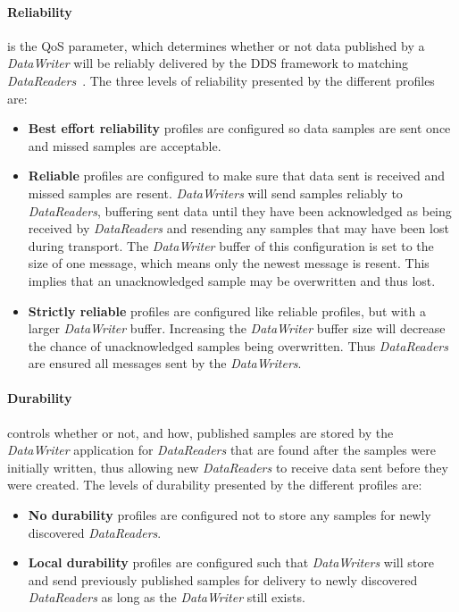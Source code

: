 \paragraph{Reliability} is the QoS parameter, which determines whether or not data published by a \textit{DataWriter} will be reliably delivered by the DDS framework to matching \textit{DataReaders}~\cite{rtiConnextUsersManual}. The three levels of reliability presented by the different profiles are:

\begin{itemize}
	\item \textbf{Best effort reliability} profiles are configured so data samples are sent once and missed samples are acceptable.
	\item \textbf{Reliable} profiles are configured to make sure that data sent is received and missed samples are resent. \textit{DataWriters} will send samples reliably to \textit{DataReaders}, buffering sent data until they have been acknowledged as being received by \textit{DataReaders} and resending any samples that may have been lost during transport. The \textit{DataWriter} buffer of this configuration is set to the size of one message, which means only the newest message is resent. This implies that an unacknowledged sample may be overwritten and thus lost. 
	\item \textbf{Strictly reliable} profiles are configured like reliable profiles, but with a larger \textit{DataWriter} buffer. Increasing the \textit{DataWriter} buffer size will decrease the chance of unacknowledged samples being overwritten. Thus \textit{DataReaders} are ensured all messages sent by the \textit{DataWriters}.
\end{itemize}

\paragraph{Durability} controls whether or not, and how, published samples are stored by the \textit{DataWriter} application for \textit{DataReaders} that are found after the samples were initially written, thus allowing new \textit{DataReaders} to receive data sent before they were created. The levels of durability presented by the different profiles are:

\begin{itemize}
	\item \textbf{No durability} profiles are configured not to store any samples for newly discovered \textit{DataReaders}.
	\item \textbf{Local durability} profiles are configured such that \textit{DataWriters} will store and send previously published samples for delivery to newly discovered \textit{DataReaders} as long as the \textit{DataWriter} still exists.
\end{itemize}

